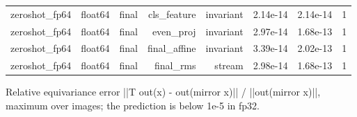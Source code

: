 \begin{table}[t]
\begin{tabular}{lrrrrrrr}
zeroshot\_fp64 & float64 & final & cls\_feature & invariant & 2.14e-14 & 2.14e-14 & 1 \\
zeroshot\_fp64 & float64 & final & even\_proj & invariant & 2.97e-14 & 1.68e-13 & 1 \\
zeroshot\_fp64 & float64 & final & final\_affine & invariant & 3.39e-14 & 2.02e-13 & 1 \\
zeroshot\_fp64 & float64 & final & final\_rms & stream & 2.98e-14 & 1.68e-13 & 1 \\
\bottomrule
\end{tabular}
\par\smallskip\footnotesize Relative equivariance error ||T out(x) - out(mirror x)|| / ||out(mirror x)||, maximum over images; the prediction is below 1e-5 in fp32.
\end{table}
